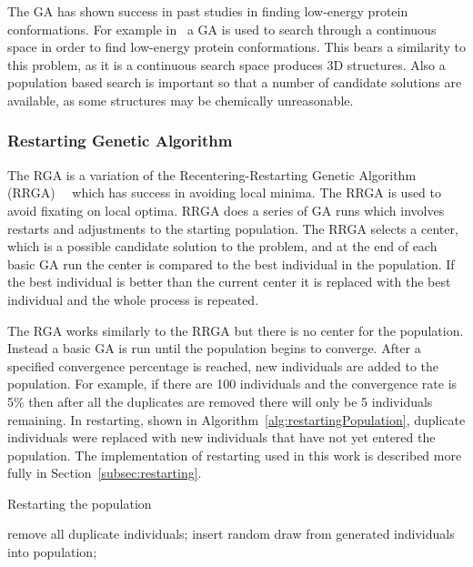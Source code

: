 \documentclass[conference]{IEEEtran}
\begin{document}
The GA has shown success in past studies in finding low-energy protein conformations. For example in~\cite{comte2010bioinspired} a GA is used to search through a continuous space in order to find low-energy protein conformations. This bears a similarity to this problem, as it is a continuous search space produces 3D structures. Also a population based search is important so that a number of candidate solutions are available, as some structures may be chemically unreasonable.

\subsubsection{Restarting Genetic Algorithm}

The RGA is a variation of the Recentering-Restarting Genetic Algorithm (RRGA)~\cite{hughes2013recentering}~\cite{hughes2013edit} which has success in avoiding local minima. The RRGA is used to avoid fixating on local optima. RRGA does a series of GA runs which involves restarts and adjustments to the starting population. The RRGA selects a center, which is a possible candidate solution to the problem, and at the end of each basic GA run the center is compared to the best individual in the population. If the best individual is better than the current center it is replaced with the best individual and the whole process is repeated.

The RGA works similarly to the RRGA but there is no center for the population. Instead a basic GA is run until the population begins to converge. After a specified convergence percentage is reached, new individuals are added to the population. For example, if there are 100 individuals and the convergence rate is 5\% then after all the duplicates are removed there will only be 5 individuals remaining. In restarting, shown in Algorithm~\ref{alg:restartingPopulation}, duplicate individuals were replaced with new individuals that have not yet entered the population. The implementation of restarting used in this work is described more fully in Section~\ref{subsec:restarting}.

\begin{algorithm}
\caption{Restarting the population}
\label{alg:restartingPopulation}
\begin{algorithmic}

  \STATE remove all duplicate individuals;
    \STATE insert random draw from generated individuals into population;
  \ENDWHILE
\ENDIF

\end{algorithmic}
\end{algorithm}
\end{document}
